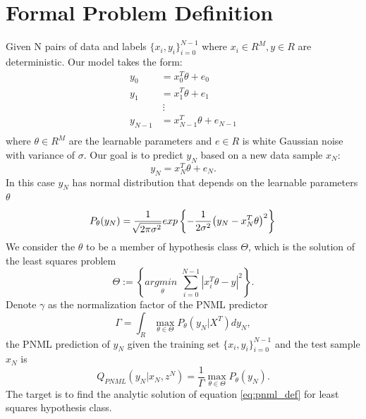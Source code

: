 \documentclass[conference,letterpaper]{IEEEtran}
\begin{document}
\section{Formal Problem Definition} \label{sec:formal_problem_def}
Given N pairs of data and labels $\{x_i, y_i\}_{i=0}^{N-1}$ where $x_i \in R^M, y\in R$ are deterministic. Our model takes the form:
\begin{equation}
\begin{split}
y_0&=x_0^T \theta + e_0 \\
y_1&=x_1^T \theta + e_1 \\
   &\ \vdots \\
y_{N-1}&=x_{N-1}^T \theta + e_{N-1} \\
\end{split}
\end{equation}
where $\theta \in R^M$ are the learnable parameters and $e \in R$ is white Gaussian noise with variance of $\sigma$. 
Our goal is to predict $y_N$ based on a new data sample $x_N$:
\begin{equation}
y_N = x_N^T \theta + e_N.
\end{equation}
In this case $y_N$ has normal distribution that depends on the learnable parameters $\theta$ 
\begin{equation}
P_{\theta}(y_N) 
=\frac{1}{\sqrt[]{2\pi\sigma^2}}exp\left\{-\frac{1}{2\sigma^2}\big(y_N- x_N^T\theta \big)^2\right\}  \\
\end{equation}
We consider the $\theta$ to be a member of hypothesis class $\Theta$, which is the solution of the least squares problem
\begin{equation} \label{eq:ls_hypotheses_class}
\Theta := \left\{ \underset{\theta}{\textit{argmin }} \sum_{i=0}^{N-1} | x^T_i \theta - y |^2 \right\}.
\end{equation}
Denote $\gamma$ as the normalization factor of the PNML predictor
\begin{equation}
\Gamma=\int_R \max_{\theta \in \Theta} P_\theta(y_N|X^T)dy_N,   
\end{equation}
the PNML prediction of $y_N$ given the training set $\{x_i,y_i\}_{i=0}^{N-1}$ and the test sample $x_N$ is
\begin{equation} \label{eq:pnml_def}
Q_{\textit{PNML}}(y_N|x_N,z^N) = \frac{1}{\Gamma} \max_{\theta \in \Theta} P_\theta(y_N).
\end{equation}
The target is to find the analytic solution of equation \ref{eq:pnml_def} for least squares hypothesis class.
\end{document}
